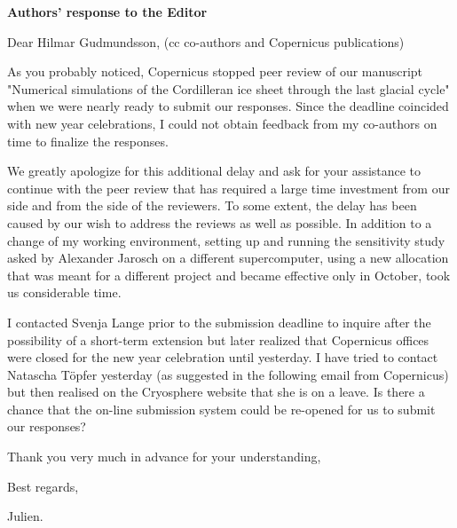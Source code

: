 


\textbf{Authors' response to the Editor}
\bigskip

Dear Hilmar Gudmundsson,
(cc co-authors and Copernicus publications)

As you probably noticed, Copernicus stopped peer review of our manuscript
"Numerical simulations of the Cordilleran ice sheet through the last glacial
cycle" when we were nearly ready to submit our responses. Since the deadline
coincided with new year celebrations, I could not obtain feedback from my
co-authors on time to finalize the responses.

We greatly apologize for this additional delay and ask for your assistance to
continue with the peer review that has required a large time investment from
our side and from the side of the reviewers. To some extent, the delay has been
caused by our wish to address the reviews as well as possible. In addition to a
change of my working environment, setting up and running the sensitivity study
asked by Alexander Jarosch on a different supercomputer, using a new allocation
that was meant for a different project and became effective only in October,
took us considerable time.

I contacted Svenja Lange prior to the submission deadline to inquire after the
possibility of a short-term extension but later realized that Copernicus
offices were closed for the new year celebration until yesterday. I have tried
to contact Natascha T\"{o}pfer yesterday (as suggested in the following email from
Copernicus) but then realised on the Cryosphere website that she is on a leave.
Is there a chance that the on-line submission system could be re-opened for us
to submit our responses?

Thank you very much in advance for your understanding,

Best regards,

Julien.


